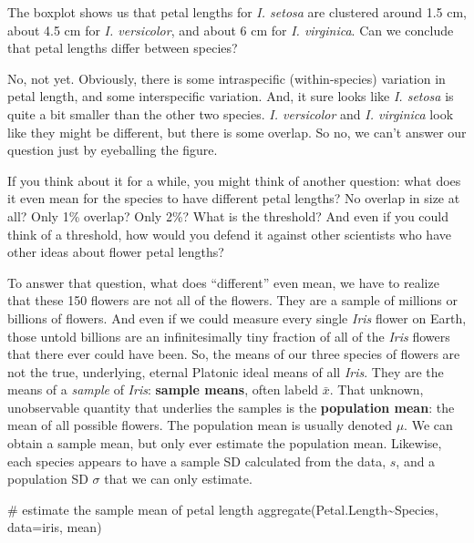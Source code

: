\documentclass[
  13,
  letterpaper,
]{report}
\newenvironment{Shaded}{\begin{snugshade}}{\end{snugshade}}
\newcommand{\AttributeTok}[1]{\textcolor[rgb]{0.40,0.45,0.13}{#1}}
\newcommand{\CommentTok}[1]{\textcolor[rgb]{0.37,0.37,0.37}{#1}}
\newcommand{\FunctionTok}[1]{\textcolor[rgb]{0.28,0.35,0.67}{#1}}
\newcommand{\NormalTok}[1]{\textcolor[rgb]{0.00,0.23,0.31}{#1}}
\newcommand{\SpecialCharTok}[1]{\textcolor[rgb]{0.37,0.37,0.37}{#1}}
\begin{document}
The boxplot shows us that petal lengths for \emph{I. setosa} are
clustered around 1.5 cm, about 4.5 cm for \emph{I. versicolor}, and
about 6 cm for \emph{I. virginica}. Can we conclude that petal lengths
differ between species?

No, not yet. Obviously, there is some intraspecific (within-species)
variation in petal length, and some interspecific variation. And, it
sure looks like \emph{I. setosa} is quite a bit smaller than the other
two species. \emph{I. versicolor} and \emph{I. virginica} look like they
might be different, but there is some overlap. So no, we can't answer
our question just by eyeballing the figure.

If you think about it for a while, you might think of another question:
what does it even mean for the species to have different petal lengths?
No overlap in size at all? Only 1\% overlap? Only 2\%? What is the
threshold? And even if you could think of a threshold, how would you
defend it against other scientists who have other ideas about flower
petal lengths?

To answer that question, what does ``different'' even mean, we have to
realize that these 150 flowers are not all of the flowers. They are a
sample of millions or billions of flowers. And even if we could measure
every single \emph{Iris} flower on Earth, those untold billions are an
infinitesimally tiny fraction of all of the \emph{Iris} flowers that
there ever could have been. So, the means of our three species of
flowers are not the true, underlying, eternal Platonic ideal means of
all \emph{Iris}. They are the means of a \emph{sample} of \emph{Iris}:
\textbf{sample means}, often labeld \(\bar{x}\). That unknown,
unobservable quantity that underlies the samples is the
\textbf{population mean}: the mean of all possible flowers. The
population mean is usually denoted \(\mu\). We can obtain a sample mean,
but only ever estimate the population mean. Likewise, each species
appears to have a sample SD calculated from the data, \(s\), and a
population SD \(\sigma\) that we can only estimate.

\begin{Shaded}
\begin{Highlighting}[]
\CommentTok{\# estimate the sample mean of petal length}
\FunctionTok{aggregate}\NormalTok{(Petal.Length}\SpecialCharTok{\textasciitilde{}}\NormalTok{Species, }\AttributeTok{data=}\NormalTok{iris, mean)}
\end{Highlighting}
\end{Shaded}
\end{document}
